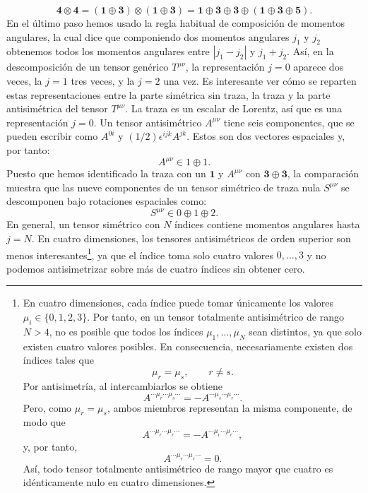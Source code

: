 \documentclass[a4paper,11pt]{book} %
\begin{document}
\begin{equation}
\mathbf{4}\otimes\mathbf{4}
=
(\mathbf{1}\oplus\mathbf{3})\otimes(\mathbf{1}\oplus\mathbf{3})
=
\mathbf{1}\oplus\mathbf{3}\oplus\mathbf{3}\oplus(\mathbf{1}\oplus\mathbf{3}\oplus\mathbf{5}).
\end{equation}
\noindent
En el último paso hemos usado la regla habitual de composición de momentos angulares, la cual dice que componiendo dos momentos angulares $j_{1}$ y $j_{2}$ obtenemos todos los momentos angulares entre $|j_{1}-j_{2}|$ y $j_{1}+j_{2}$. Así, en la descomposición de un tensor genérico $T^{\mu\nu}$, la representación $j=0$ aparece dos veces, la $j=1$ tres veces, y la $j=2$ una vez.
\medskip\newline
Es interesante ver cómo se reparten estas representaciones entre la parte simétrica sin traza, la traza y la parte antisimétrica del tensor $T^{\mu\nu}$. La traza es un escalar de Lorentz, así que es una representación $j=0$. Un tensor antisimétrico $A^{\mu\nu}$ tiene seis componentes, que se pueden escribir como $A^{0i}$ y $(1/2)\epsilon^{ijk}A^{jk}$. Estos son dos vectores espaciales y, por tanto:
\begin{equation}
A^{\mu\nu}\in{1}\oplus{1}.
\end{equation}
Puesto que hemos identificado la traza con un $\mathbf{1}$ y $A^{\mu\nu}$ con $\mathbf{3}\oplus\mathbf{3}$, la comparación muestra que las nueve componentes de un tensor simétrico de traza nula $S^{\mu\nu}$ se descomponen bajo rotaciones espaciales como:
\begin{equation}
S^{\mu\nu}\in{0}\oplus{1}\oplus{2}.
\end{equation}
\noindent
En general, un tensor simétrico con $N$ índices contiene momentos angulares hasta $j=N$. En cuatro dimensiones, los tensores antisimétricos de orden superior son menos interesantes\footnote{En cuatro dimensiones, cada índice puede tomar únicamente los valores $\mu_i\in\{0,1,2,3\}$. Por tanto, en un tensor totalmente antisimétrico de rango $N>4$, no es posible que todos los índices $\mu_1,\ldots,\mu_N$ sean distintos, ya que solo existen cuatro valores posibles. En consecuencia, necesariamente existen dos índices tales que
\begin{equation}
\mu_r=\mu_s,
\qquad r\neq s.
\end{equation}
Por antisimetría, al intercambiarlos se obtiene
\begin{equation}
A^{\cdots\mu_r\cdots\mu_s\cdots}
=
-
A^{\cdots\mu_s\cdots\mu_r\cdots}.
\end{equation}
Pero, como $\mu_r=\mu_s$, ambos miembros representan la misma componente, de modo que
\begin{equation}
A^{\cdots\mu_r\cdots\mu_r\cdots}
=
-
A^{\cdots\mu_r\cdots\mu_r\cdots},
\end{equation}
y, por tanto,
\begin{equation}
A^{\cdots\mu_r\cdots\mu_r\cdots}=0.
\end{equation}
Así, todo tensor totalmente antisimétrico de rango mayor que cuatro es idénticamente nulo en cuatro dimensiones.}, ya que el índice toma solo cuatro valores $0,\dots,3$ y no podemos antisimetrizar sobre más de cuatro índices sin obtener cero.
\end{document}
